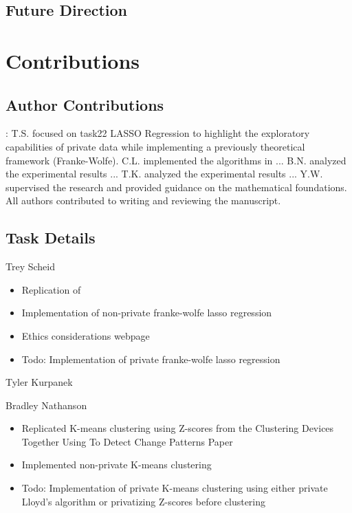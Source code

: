 \documentclass[12pt,letterpaper]{article}
\begin{document}
\subsection{Future Direction}



\section{Contributions}

\subsection{Author Contributions}:
T.S. focused on task22 LASSO Regression to highlight the exploratory capabilities of private data while implementing a previously theoretical framework (Franke-Wolfe). C.L. implemented the algorithms in ... B.N. analyzed the experimental results ... T.K. analyzed the experimental results ... Y.W. supervised the research and provided guidance on the mathematical foundations. All authors contributed to writing and reviewing the manuscript.

\subsection{Task Details}

Trey Scheid
\begin{itemize}
    \item Replication of 
    \item Implementation of non-private franke-wolfe lasso regression
    \item Ethics considerations webpage
    \item [ ] Todo: Implementation of private franke-wolfe lasso regression
\end{itemize}

Tyler Kurpanek

Bradley Nathanson
\begin{itemize}
    \item Replicated K-means clustering using Z-scores from the Clustering Devices Together Using To Detect Change Patterns Paper
    \item Implemented non-private K-means clustering 
    \item [ ] Todo: Implementation of private K-means clustering using either private Lloyd's algorithm or privatizing Z-scores before clustering
\end{itemize}
\end{document}
